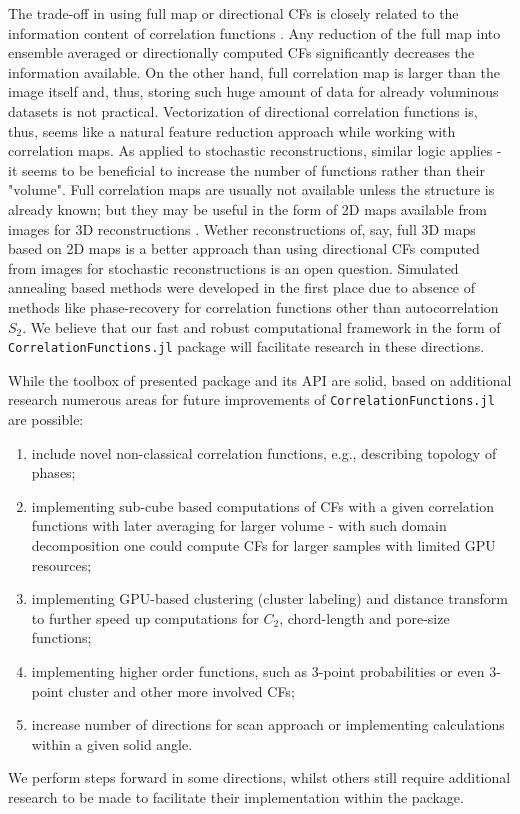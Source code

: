 \documentclass[1p]{elsarticle}
\newcommand{\code}[1]{\colorbox{light-gray}{\texttt{#1}}}
\begin{document}
The trade-off in using full map or directional CFs is closely related to the
information content of correlation functions
\cite{Gommes1,Gommes2,skolnick2021}. Any reduction of the full map into ensemble
averaged or directionally computed CFs significantly decreases the information
available. On the other hand, full correlation map is larger than the image
itself and, thus, storing such huge amount of data for already voluminous
datasets is not practical.  Vectorization of directional correlation functions
is, thus, seems like a natural feature reduction approach while working with
correlation maps. As applied to stochastic reconstructions, similar logic
applies - it seems to be beneficial to increase the number of functions rather
than their "volume". Full correlation maps are usually not available unless the
structure is already known; but they may be useful in the form of 2D maps
available from images for 3D reconstructions \cite{cherkasov2021}. Wether
reconstructions of, say, full 3D maps based on 2D maps is a better approach than
using directional CFs computed from images for stochastic reconstructions is an
open question. Simulated annealing based methods were developed in the first
place due to absence of methods like phase-recovery for correlation functions
other than autocorrelation $S_2$. We believe that our fast and robust
computational framework in the form of \code{CorrelationFunctions.jl} package
will facilitate research in these directions.

While the toolbox of presented package and its API are solid, based on
additional research numerous areas for future improvements of
\code{CorrelationFunctions.jl} are possible:
\begin{enumerate}
\item include novel non-classical correlation functions, e.g., describing
  topology of phases;
\item implementing sub-cube based computations of CFs with a given correlation
  functions with later averaging for larger volume - with such domain
  decomposition one could compute CFs for larger samples with limited GPU
  resources;
\item implementing GPU-based clustering (cluster labeling) and distance
  transform to further speed up computations for $C_2$, chord-length and
  pore-size functions;
\item implementing higher order functions, such as 3-point probabilities or even
  3-point cluster and other more involved CFs;
\item increase number of directions for scan approach or implementing
  calculations within a given solid angle.
\end{enumerate}
We perform steps forward in some directions, whilst others still require
additional research to be made to facilitate their implementation within the
package.
\end{document}
